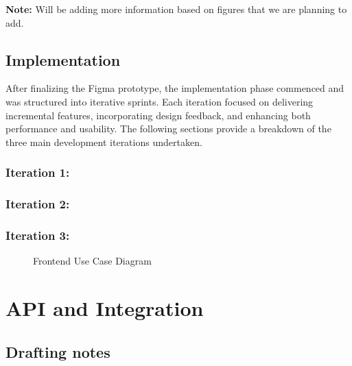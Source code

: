 \textbf{Note:} Will be adding more information based on figures that we are planning to add.

\subsection{Implementation}

After finalizing the Figma prototype, the implementation phase commenced and was structured into iterative sprints. Each iteration focused on delivering incremental features, incorporating design feedback, and enhancing both performance and usability. The following sections provide a breakdown of the three main development iterations undertaken.

\subsubsection{Iteration 1:}

\subsubsection{Iteration 2:}

\subsubsection{Iteration 3:}

\begin{figure}[h]
    \centering
    \caption{Frontend Use Case Diagram}
    \label{fig:frontend_usecase}
\end{figure}

\section{API and Integration}
\subsection{Drafting notes}

